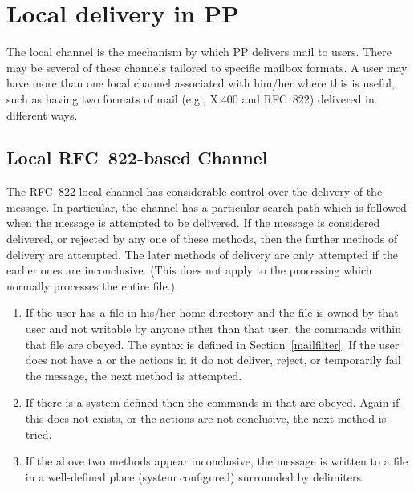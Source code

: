
\chapter{Local delivery in PP}

The local channel is the mechanism by which PP delivers mail to users.
There may be several of these channels tailored to specific mailbox
formats. A user may have more than one local channel associated with
him/her where this is useful, such as having two formats of mail (e.g.,
X.400 and RFC~822) delivered in different ways.


\section{Local RFC~822-based Channel}

The RFC~822 local channel has considerable control over the delivery
of the message. In particular, the channel has a particular search
path which is followed when the message is attempted to be delivered.
If the message is considered delivered, or rejected by any one of these
methods, then the further methods of delivery are attempted. The later
methods of delivery are only attempted if the earlier ones are
inconclusive. (This does not apply to the 
processing which normally processes the entire file.)

\begin{enumerate}
\item	If the user has a 
file in his/her home directory and the file is owned by that user and
not writable by anyone other than that user, the commands within that
file are obeyed.  The syntax is defined in Section~\ref{mailfilter}.
If the user does not have a  or the actions in it do
not deliver, reject, or temporarily fail the message, the next method is
attempted. 

\item If there is a system defined  then the
commands in that are obeyed. Again if this does not exists, or the
actions are not conclusive, the next method is tried.

\item	If the above two methods appear inconclusive, the message is
written to a file in a well-defined place (system configured)
surrounded by delimiters.

\end{enumerate}

